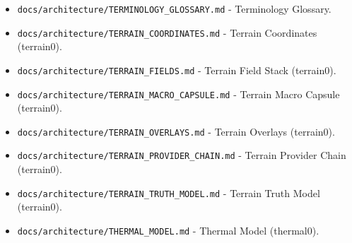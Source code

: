 \documentclass[9pt,a4paper,openany]{book}
\begin{document}
\begin{itemize}
\item \texttt{docs/\allowbreak{}architecture/\allowbreak{}TERMINOLOGY\_\allowbreak{}GLOSSARY.\allowbreak{}md} -\allowbreak{} Terminology Glossary.\allowbreak{}
\end{itemize}

\begin{itemize}
\item \texttt{docs/\allowbreak{}architecture/\allowbreak{}TERRAIN\_\allowbreak{}COORDINATES.\allowbreak{}md} -\allowbreak{} Terrain Coordinates (terrain0).\allowbreak{}
\end{itemize}

\begin{itemize}
\item \texttt{docs/\allowbreak{}architecture/\allowbreak{}TERRAIN\_\allowbreak{}FIELDS.\allowbreak{}md} -\allowbreak{} Terrain Field Stack (terrain0).\allowbreak{}
\end{itemize}

\begin{itemize}
\item \texttt{docs/\allowbreak{}architecture/\allowbreak{}TERRAIN\_\allowbreak{}MACRO\_\allowbreak{}CAPSULE.\allowbreak{}md} -\allowbreak{} Terrain Macro Capsule (terrain0).\allowbreak{}
\end{itemize}

\begin{itemize}
\item \texttt{docs/\allowbreak{}architecture/\allowbreak{}TERRAIN\_\allowbreak{}OVERLAYS.\allowbreak{}md} -\allowbreak{} Terrain Overlays (terrain0).\allowbreak{}
\end{itemize}

\begin{itemize}
\item \texttt{docs/\allowbreak{}architecture/\allowbreak{}TERRAIN\_\allowbreak{}PROVIDER\_\allowbreak{}CHAIN.\allowbreak{}md} -\allowbreak{} Terrain Provider Chain (terrain0).\allowbreak{}
\end{itemize}

\begin{itemize}
\item \texttt{docs/\allowbreak{}architecture/\allowbreak{}TERRAIN\_\allowbreak{}TRUTH\_\allowbreak{}MODEL.\allowbreak{}md} -\allowbreak{} Terrain Truth Model (terrain0).\allowbreak{}
\end{itemize}

\begin{itemize}
\item \texttt{docs/\allowbreak{}architecture/\allowbreak{}THERMAL\_\allowbreak{}MODEL.\allowbreak{}md} -\allowbreak{} Thermal Model (thermal0).\allowbreak{}
\end{itemize}
\end{document}
